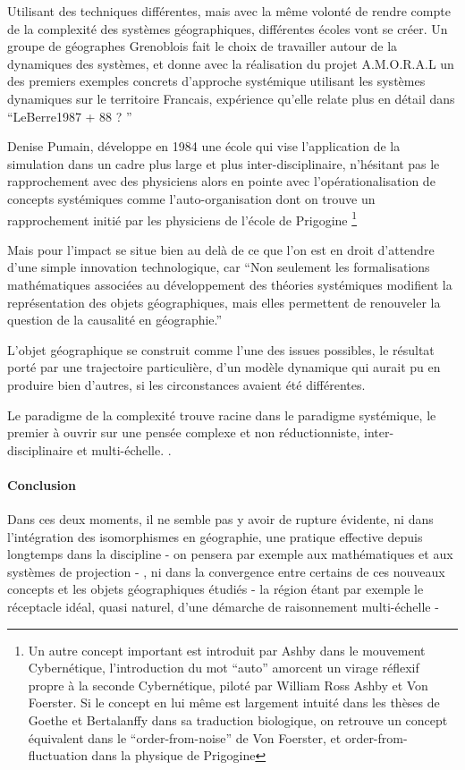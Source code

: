Utilisant des techniques différentes, mais avec la même volonté de rendre compte de la complexité des systèmes géographiques, différentes écoles vont se créer. Un groupe de géographes Grenoblois fait le choix de travailler autour de la dynamiques des systèmes, et donne avec la réalisation du projet A.M.O.R.A.L \autocite{1984} un des premiers exemples concrets d'approche systémique utilisant les systèmes dynamiques sur le territoire Francais, expérience qu'elle relate plus en détail dans \enquote{LeBerre1987 + 88 ? }

Denise Pumain, développe en 1984 une école qui vise l'application de la simulation dans un cadre plus large et plus inter-disciplinaire, n'hésitant pas le rapprochement avec des physiciens alors en pointe avec l'opérationalisation de concepts systémiques comme l'auto-organisation dont on trouve un rapprochement initié par les physiciens de l'école de Prigogine \footnote{Un autre concept important est introduit par Ashby dans le mouvement Cybernétique, l'introduction du mot \enquote{auto} amorcent un virage réflexif propre à la seconde Cybernétique, piloté par William Ross Ashby et Von Foerster. Si le concept en lui même est largement intuité dans les thèses de Goethe et Bertalanffy \autocite[102]{Pouvreau2013} dans sa traduction biologique, on retrouve un concept équivalent dans le \enquote{order-from-noise} de Von Foerster, et order-from-fluctuation dans la physique de Prigogine} 

Mais pour \textcite[137]{Pumain2002} l'impact se situe bien au delà de ce que l'on est en droit d'attendre d'une simple innovation technologique, car \enquote{Non seulement les formalisations mathématiques associées au développement des théories systémiques modifient la représentation des objets géographiques, mais elles permettent de renouveler la question de la causalité en géographie.}

L’objet géographique se construit comme l’une des issues possibles, le résultat porté par une trajectoire particulière, d’un modèle dynamique qui
aurait pu en produire bien d’autres, si les circonstances avaient été différentes.

Le paradigme de la complexité trouve racine dans le paradigme systémique, le premier à ouvrir sur une pensée complexe et non réductionniste, inter-disciplinaire et multi-échelle.  \autocite{Rosnay1975}. 

\paragraph{Conclusion}
Dans ces deux moments, il ne semble pas y avoir de rupture évidente, ni dans l'intégration des isomorphismes en géographie, une pratique effective depuis longtemps dans la discipline - on pensera par exemple aux mathématiques et aux systèmes de projection - , ni dans la convergence entre certains de ces nouveaux concepts et les objets géographiques étudiés - la région étant par exemple le réceptacle idéal, quasi naturel, d'une démarche de raisonnement multi-échelle -



